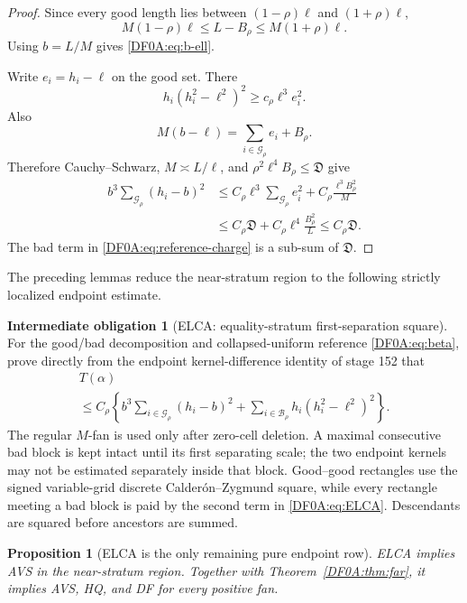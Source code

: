 \documentclass[11pt]{amsart}
\numberwithin{equation}{section}
\newtheorem{proposition}[theorem]{Proposition}
\theoremstyle{definition}
\newtheorem{obligation}[theorem]{Intermediate obligation}
\theoremstyle{remark}
\begin{document}
\begin{proof}
Since every good length lies between $(1-\rho)\ell$ and
$(1+\rho)\ell$,
\[
 M(1-\rho)\ell\le L-B_\rho
 \le M(1+\rho)\ell.
\]
Using $b=L/M$ gives \eqref{DF0A:eq:b-ell}.

Write $e_i=h_i-\ell$ on the good set.  There
\[
 h_i(h_i^2-\ell^2)^2\ge c_\rho\ell^3e_i^2.
\]
Also
\[
 M(b-\ell)=\sum_{i\in\mathcal G_\rho}e_i+B_\rho.
\]
Therefore Cauchy--Schwarz, $M\asymp L/\ell$, and
$\rho^2\ell^4B_\rho\le\mathfrak D$ give
\begin{align*}
 b^3\sum_{\mathcal G_\rho}(h_i-b)^2
 &\le C_\rho\ell^3\sum_{\mathcal G_\rho}e_i^2
   +C_\rho\frac{\ell^3B_\rho^2}{M}\\
 &\le C_\rho\mathfrak D
   +C_\rho\ell^4\frac{B_\rho^2}{L}
 \le C_\rho\mathfrak D.
\end{align*}
The bad term in \eqref{DF0A:eq:reference-charge} is a sub-sum of
$\mathfrak D$.
\end{proof}

The preceding lemmas reduce the near-stratum region to the following
strictly localized endpoint estimate.

\begin{obligation}[ELCA: equality-stratum first-separation square]
\label{DF0A:obl:ELCA}
For the good/bad decomposition and collapsed-uniform reference
\eqref{DF0A:eq:beta}, prove directly from the endpoint kernel-difference
identity of stage 152 that
\begin{multline}\label{DF0A:eq:ELCA}
 T(\alpha)\\
 \le C_\rho\left\{
 b^3\sum_{i\in\mathcal G_\rho}(h_i-b)^2
 +\sum_{i\in\mathcal B_\rho}h_i(h_i^2-\ell^2)^2
 \right\}.
\end{multline}
The regular $M$-fan is used only after zero-cell deletion.  A maximal
consecutive bad block is kept intact until its first separating scale;
the two endpoint kernels may not be estimated separately inside that
block.  Good--good rectangles use the signed variable-grid discrete
Calder\'on--Zygmund square, while every rectangle meeting a bad block is
paid by the second term in \eqref{DF0A:eq:ELCA}.  Descendants are squared
before ancestors are summed.
\end{obligation}

\begin{proposition}[ELCA is the only remaining pure endpoint row]
\label{DF0A:prop:ELCA}
ELCA implies AVS in the near-stratum region.  Together with
Theorem~\ref{DF0A:thm:far}, it implies AVS, HQ, and DF for every positive fan.
\end{proposition}
\end{document}
